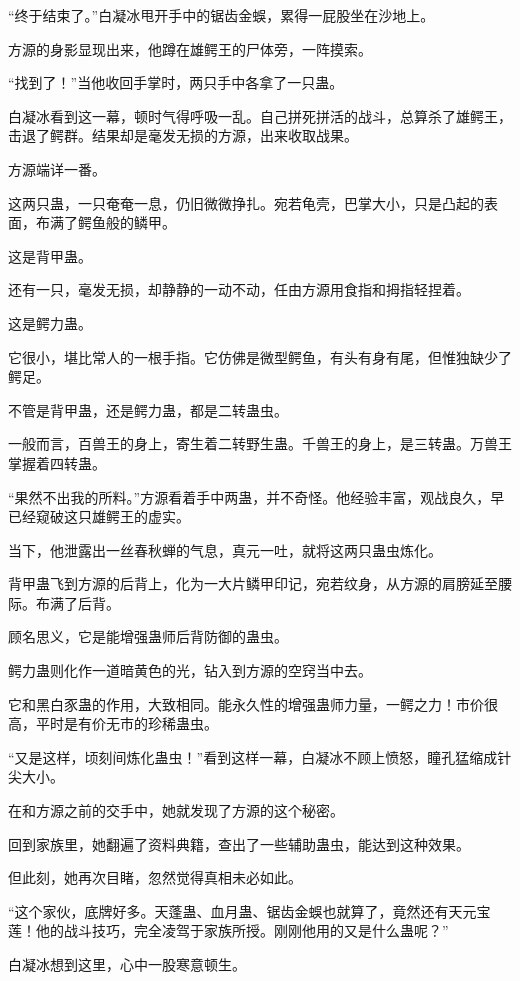 \begin{this_body}
“终于结束了。”白凝冰甩开手中的锯齿金蜈，累得一屁股坐在沙地上。

方源的身影显现出来，他蹲在雄鳄王的尸体旁，一阵摸索。

“找到了！”当他收回手掌时，两只手中各拿了一只蛊。

白凝冰看到这一幕，顿时气得呼吸一乱。自己拼死拼活的战斗，总算杀了雄鳄王，击退了鳄群。结果却是毫发无损的方源，出来收取战果。

方源端详一番。

这两只蛊，一只奄奄一息，仍旧微微挣扎。宛若龟壳，巴掌大小，只是凸起的表面，布满了鳄鱼般的鳞甲。

这是背甲蛊。

还有一只，毫发无损，却静静的一动不动，任由方源用食指和拇指轻捏着。

这是鳄力蛊。

它很小，堪比常人的一根手指。它仿佛是微型鳄鱼，有头有身有尾，但惟独缺少了鳄足。

不管是背甲蛊，还是鳄力蛊，都是二转蛊虫。

一般而言，百兽王的身上，寄生着二转野生蛊。千兽王的身上，是三转蛊。万兽王掌握着四转蛊。

“果然不出我的所料。”方源看着手中两蛊，并不奇怪。他经验丰富，观战良久，早已经窥破这只雄鳄王的虚实。

当下，他泄露出一丝春秋蝉的气息，真元一吐，就将这两只蛊虫炼化。

背甲蛊飞到方源的后背上，化为一大片鳞甲印记，宛若纹身，从方源的肩膀延至腰际。布满了后背。

顾名思义，它是能增强蛊师后背防御的蛊虫。

鳄力蛊则化作一道暗黄色的光，钻入到方源的空窍当中去。

它和黑白豕蛊的作用，大致相同。能永久性的增强蛊师力量，一鳄之力！市价很高，平时是有价无市的珍稀蛊虫。

“又是这样，顷刻间炼化蛊虫！”看到这样一幕，白凝冰不顾上愤怒，瞳孔猛缩成针尖大小。

在和方源之前的交手中，她就发现了方源的这个秘密。

回到家族里，她翻遍了资料典籍，查出了一些辅助蛊虫，能达到这种效果。

但此刻，她再次目睹，忽然觉得真相未必如此。

“这个家伙，底牌好多。天蓬蛊、血月蛊、锯齿金蜈也就算了，竟然还有天元宝莲！他的战斗技巧，完全凌驾于家族所授。刚刚他用的又是什么蛊呢？”

白凝冰想到这里，心中一股寒意顿生。

\end{this_body}

